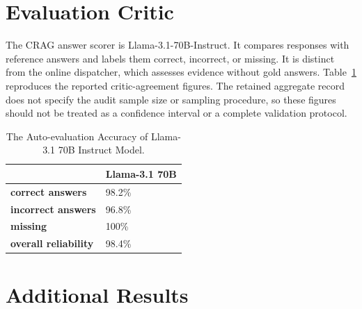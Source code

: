 \section{Evaluation Critic}
The CRAG answer scorer is Llama-3.1-70B-Instruct. It compares responses with reference answers and labels them correct, incorrect, or missing. It is distinct from the online dispatcher, which assesses evidence without gold answers. Table~\ref{tab:auto-eval} reproduces the reported critic-agreement figures. The retained aggregate record does not specify the audit sample size or sampling procedure, so these figures should not be treated as a confidence interval or a complete validation protocol.
\begin{table}[!h]
\caption{The Auto-evaluation Accuracy of Llama-3.1 70B Instruct Model.}
\label{tab:auto-eval}
\centering
\begin{tabular}{ll}
\toprule
                    & \textbf{Llama-3.1 70B} \\
\midrule
\textbf{correct answers}     & 98.2\%        \\
\textbf{incorrect answers}   & 96.8\%        \\
\textbf{missing}             & 100\%         \\
\textbf{overall reliability} & 98.4\%       \\
\bottomrule
\end{tabular}
\end{table}

\section{Additional Results}
